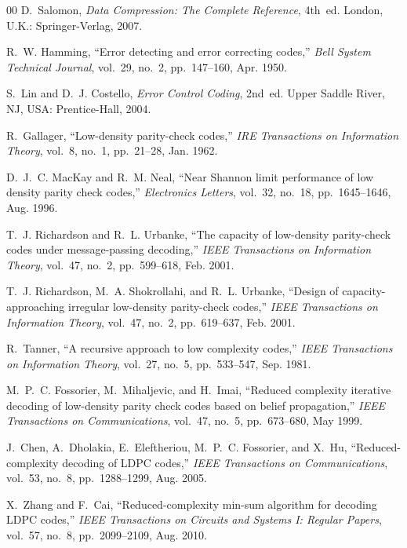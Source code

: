 \documentclass[conference]{IEEEtran}
\begin{document}
\begin{thebibliography}{00}
D.~Salomon, \textit{Data Compression: The Complete Reference}, 4th~ed. London, U.K.: Springer-Verlag, 2007.

R.~W. Hamming, ``Error detecting and error correcting codes,'' \textit{Bell System Technical Journal}, vol.~29, no.~2, pp.~147--160, Apr. 1950.

S.~Lin and D.~J. Costello, \textit{Error Control Coding}, 2nd~ed. Upper Saddle River, NJ, USA: Prentice-Hall, 2004.

R.~Gallager, ``Low-density parity-check codes,'' \textit{IRE Transactions on Information Theory}, vol.~8, no.~1, pp.~21--28, Jan. 1962.

D.~J.~C. MacKay and R.~M. Neal, ``Near Shannon limit performance of low density parity check codes,'' \textit{Electronics Letters}, vol.~32, no.~18, pp.~1645--1646, Aug. 1996.

T.~J. Richardson and R.~L. Urbanke, ``The capacity of low-density parity-check codes under message-passing decoding,'' \textit{IEEE Transactions on Information Theory}, vol.~47, no.~2, pp.~599--618, Feb. 2001.

T.~J. Richardson, M.~A. Shokrollahi, and R.~L. Urbanke, ``Design of capacity-approaching irregular low-density parity-check codes,'' \textit{IEEE Transactions on Information Theory}, vol.~47, no.~2, pp.~619--637, Feb. 2001.

R.~Tanner, ``A recursive approach to low complexity codes,'' \textit{IEEE Transactions on Information Theory}, vol.~27, no.~5, pp.~533--547, Sep. 1981.

M.~P.~C. Fossorier, M.~Mihaljevic, and H.~Imai, ``Reduced complexity iterative decoding of low-density parity check codes based on belief propagation,'' \textit{IEEE Transactions on Communications}, vol.~47, no.~5, pp.~673--680, May 1999.

J.~Chen, A.~Dholakia, E.~Eleftheriou, M.~P.~C. Fossorier, and X.~Hu, ``Reduced-complexity decoding of LDPC codes,'' \textit{IEEE Transactions on Communications}, vol.~53, no.~8, pp.~1288--1299, Aug. 2005.

X.~Zhang and F.~Cai, ``Reduced-complexity min-sum algorithm for decoding LDPC codes,'' \textit{IEEE Transactions on Circuits and Systems I: Regular Papers}, vol.~57, no.~8, pp.~2099--2109, Aug. 2010.


\end{thebibliography}
\end{document}
